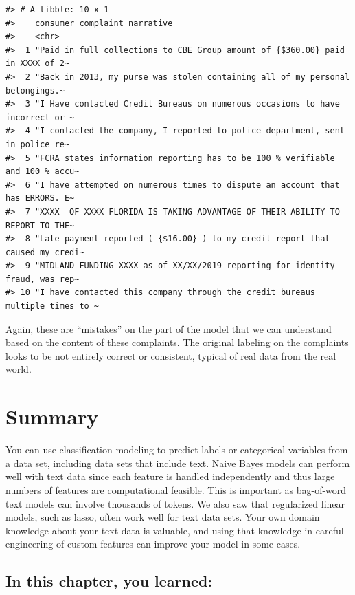 \documentclass[
]{krantz}
\begin{document}
\begin{verbatim}
#> # A tibble: 10 x 1
#>    consumer_complaint_narrative                                                 
#>    <chr>                                                                        
#>  1 "Paid in full collections to CBE Group amount of {$360.00} paid in XXXX of 2~
#>  2 "Back in 2013, my purse was stolen containing all of my personal belongings.~
#>  3 "I Have contacted Credit Bureaus on numerous occasions to have incorrect or ~
#>  4 "I contacted the company, I reported to police department, sent in police re~
#>  5 "FCRA states information reporting has to be 100 % verifiable and 100 % accu~
#>  6 "I have attempted on numerous times to dispute an account that has ERRORS. E~
#>  7 "XXXX  OF XXXX FLORIDA IS TAKING ADVANTAGE OF THEIR ABILITY TO REPORT TO THE~
#>  8 "Late payment reported ( {$16.00} ) to my credit report that caused my credi~
#>  9 "MIDLAND FUNDING XXXX as of XX/XX/2019 reporting for identity fraud, was rep~
#> 10 "I have contacted this company through the credit bureaus multiple times to ~
\end{verbatim}

Again, these are ``mistakes'' on the part of the model that we can understand based on the content of these complaints. The original labeling on the complaints looks to be not entirely correct or consistent, typical of real data from the real world.

\hypertarget{mlclassificationsummary}{%
\section{Summary}\label{mlclassificationsummary}}

You can use classification modeling to predict labels or categorical variables from a data set, including data sets that include text.
Naive Bayes models can perform well with text data since each feature is handled independently and thus large numbers of features are computational feasible.
This is important as bag-of-word text models can involve thousands of tokens.
We also saw that regularized linear models, such as lasso, often work well for text data sets.
Your own domain knowledge about your text data is valuable, and using that knowledge in careful engineering of custom features can improve your model in some cases.

\hypertarget{in-this-chapter-you-learned-6}{%
\subsection{In this chapter, you learned:}\label{in-this-chapter-you-learned-6}}
\end{document}
